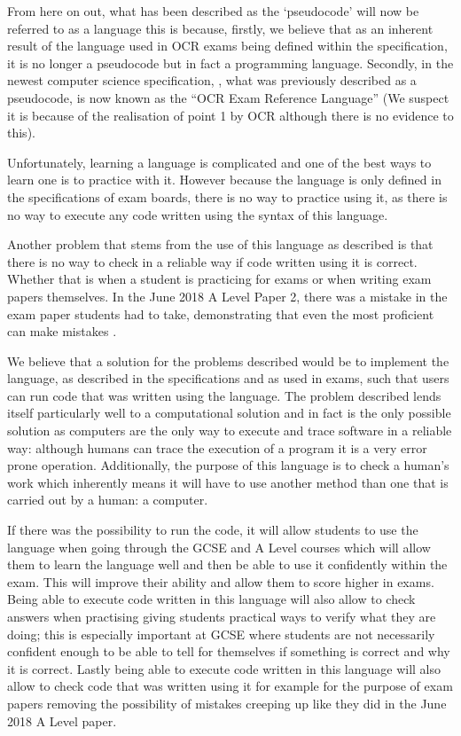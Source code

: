 \documentclass{article}
\begin{document}
From here on out, what has been described as the `pseudocode' will now be
referred to as a language this is because, firstly, we believe that as an
inherent result of the language used in OCR exams being defined within the
specification, it is no longer a pseudocode but in fact a programming language.
Secondly, in the newest computer science specification, \textcite{j277}, what
was previously described as a pseudocode, is now known as the ``OCR Exam
Reference Language'' (We suspect it is because of the realisation of point 1 by
OCR although there is no evidence to this).

Unfortunately, learning a language is complicated and one of the best ways to
learn one is to practice with it. However because the language is only defined
in the specifications of exam boards, there is no way to practice using it, as
there is no way to execute any code written using the syntax of this language.

Another problem that stems from the use of this language as described is that
there is no way to check in a reliable way if code written using it is correct.
Whether that is when a student is practicing for exams or when writing exam
papers themselves. In the June 2018 A Level Paper 2, there was a mistake in the
exam paper students had to take, demonstrating that even the most proficient
can make mistakes \cite{ocrpec18}.


We believe that a solution for the problems described would be to implement the
language, as described in the specifications and as used in exams, such that
users can run code that was written using the language. The problem described
lends itself particularly well to a computational solution and in fact is the
only possible solution as computers are the only way to execute and trace
software in a reliable way: although humans can trace the execution of a
program it is a very error prone operation. Additionally, the purpose of this
language is to check a human's work which inherently means it will have to use
another method than one that is carried out by a human: a computer.

If there was the possibility to run the code, it will allow students to use the
language when going through the GCSE and A Level courses which will allow them
to learn the language well and then be able to use it confidently within the
exam. This will improve their ability and allow them to score higher in exams.
Being able to execute code written in this language will also allow to check
answers when practising giving students practical ways to verify what they are
doing; this is especially important at GCSE where students are not necessarily
confident enough to be able to tell for themselves if something is correct and
why it is correct. Lastly being able to execute code written in this language
will also allow to check code that was written using it for example for the
purpose of exam papers removing the possibility of mistakes creeping up like
they did in the June 2018 A Level paper.
\end{document}
